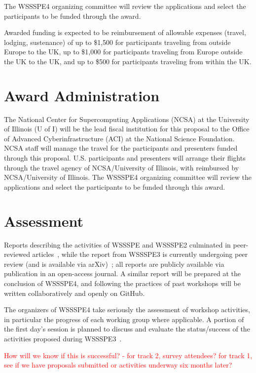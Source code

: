 \documentclass[11pt]{article}
\begin{document}
The WSSSPE4 organizing committee will review the applications and select the participants to be funded through the award. 

Awarded funding is expected to be reimbursement of allowable expenses (travel, lodging, sustenance) of up to \$1,500 for participants traveling from outside Europe to the UK, up to \$1,000 for participants traveling from Europe outside the UK to the UK, and up to \$500 for participants traveling from within the UK.

\section{Award Administration}

The National Center for Supercomputing Applications (NCSA) at the University of Illinois (U of I) will be the lead fiscal institution for this proposal to the Office of Advanced Cyberinfrastructure (ACI) at the National Science Foundation. NCSA staff will manage the travel for the participants and presenters funded through this proposal. U.S. participants and presenters will arrange their flights through the travel agency of NCSA/University of Illinois, with reimbursed by NCSA/University of Illinois. The WSSSPE4 organizing committee will review the applications and select the participants to be funded through this award. 

\section{Assessment}

Reports describing the activities of WSSSPE and WSSSPE2 culminated in peer-reviewed articles~\cite{WSSSPE1,WSSSPE2}, while the report from WSSSPE3 is currently undergoing peer review (and is available via arXiv)~\cite{WSSSPE3}; all reports are publicly available via publication in an open-access journal.
A similar report will be prepared at the conclusion of WSSSPE4, and following the practices of past workshops will be written collaboratively and openly on GitHub.

The organizers of WSSSPE4 take seriously the assessment of workshop activities, in particular the progress of each working group where applicable.
A portion of the first day's session is planned to discuss and evaluate the status\slash success of the activities proposed during WSSSPE3~\cite{WSSSPE3}.

\textcolor{red}{How will we know if this is successful? - for track 2, survey attendees?  for track 1, see if we have proposals submitted or activities underway six months later?}
\end{document}
